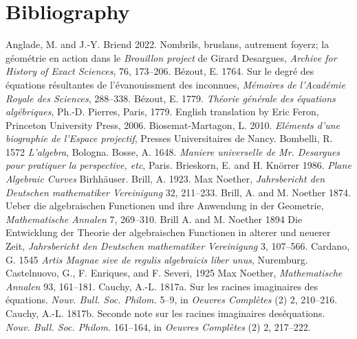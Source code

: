 \section{Bibliography}
\small
\indent Anglade, M. and J.-Y. Briend 2022. Nombrils, bruslans, autrement foyerz; la g\'eom\'etrie en action dans le \emph{Brouillon project} de Girard Desargues, \emph{Archive for History of Exact Sciences}, 76, 173--206.
\newline\indent B\'ezout, E. 1764. Sur le degr\'e des \'equations r\'esultantes de l'\'evanouissment des inconnues, \emph{M\'emoires de l'Acad\'emie Royale des Sciences}, 288--338.
\newline\indent B\'ezout, E. 1779. \emph{Th\'eorie g\'en\'erale des \'equations alg\'ebriques}, Ph.-D. Pierres, Paris, 1779. English translation by Eric Feron, Princeton University Press, 2006.
\newline\indent  Biosemat-Martagon, L. 2010. \emph{El\'ements d'une biographie de l'Espace projectif}, Presses Universitaires de Nancy.
\newline\indent Bombelli, R. 1572 \emph{L'algebra}, Bologna.
\newline\indent Bosse, A.  1648. \emph{Maniere universelle de Mr. Desargues pour pratiquer la perspective, etc}, Paris.
\newline\indent Brieskorn, E. and  H. Kn\"orrer 1986. \emph{Plane Algebraic Curves} Birhh\"auser.
\newline\indent Brill, A. 1923. Max Noether, \emph{Jahrsbericht den Deutschen mathematiker Vereinigung} 32, 211--233.
\newline\indent Brill, A. and M. Noether  1874.  Ueber die algebraischen Functionen und ihre Anwendung in der Geometrie, \emph{Mathematische Annalen} 7, 269--310.
\newline\indent Brill A. and M. Noether 1894  Die Entwicklung der Theorie der algebraischen Functionen in alterer und neuerer Zeit, \emph{Jahrsbericht den Deutschen mathematiker Vereinigung} 3, 107--566.
\newline\indent Cardano, G. 1545  \emph{Artis Magnae sive de regulis algebraicis liber unus}, Nuremburg. 
\newline\indent Castelnuovo, G., F. Enriques, and F. Severi, 1925 Max Noether, \emph{Mathematische Annalen} 93, 161--181.
\newline\indent Cauchy, A.-L. 1817a. Sur les racines imaginaires des \'equations. \emph{Nouv. Bull. Soc. Philom.} 5--9, in  \emph{Oeuvres Compl\`etes} (2) 2, 210--216.
 \newline\indent Cauchy, A.-L. 1817b. Seconde note sur les racines imaginaires des\'equa\-tions. \emph{Nouv. Bull. Soc. Philom.} 161--164, in \emph{Oeuvres Compl\`etes} (2) 2, 217--222.
